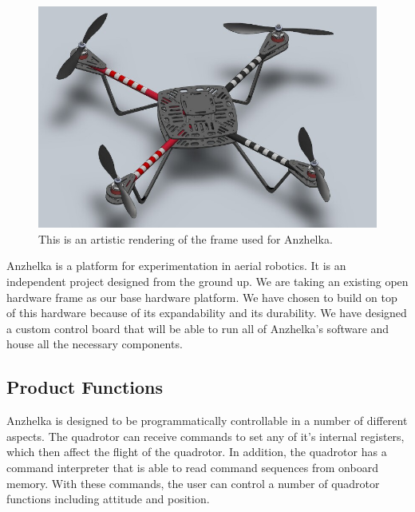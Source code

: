 \documentclass[english]{article}
\numberwithin{equation}{section} %
\begin{document}
\begin{figure}[h!]
  \centering
	\includegraphics[scale=.6]{elev_8_rendering.JPG}
  \caption{This is an artistic rendering of the frame used for Anzhelka.}
\end{figure}  
Anzhelka is a platform for experimentation in aerial robotics. It is an independent project designed from the ground up. We are taking an existing open hardware frame as our base hardware platform. We have chosen to build on top of this hardware because of its expandability and its durability. We have designed a custom control board that will be able to run all of Anzhelka's software and house all the necessary components.\\
%
%


\subsection{Product Functions}
Anzhelka is designed to be programmatically controllable in a number of different aspects. The quadrotor can receive commands to set any of it's internal registers, which then affect the flight of the quadrotor. In addition, the quadrotor has a command interpreter that is able to read command sequences from onboard memory. With these commands, the user can control a number of quadrotor functions including attitude and position.
\end{document}
